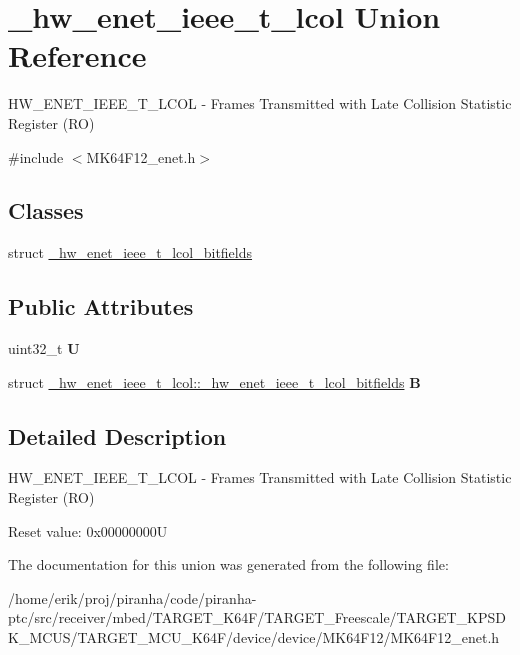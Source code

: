 \hypertarget{union__hw__enet__ieee__t__lcol}{}\section{\+\_\+hw\+\_\+enet\+\_\+ieee\+\_\+t\+\_\+lcol Union Reference}
\label{union__hw__enet__ieee__t__lcol}


H\+W\+\_\+\+E\+N\+E\+T\+\_\+\+I\+E\+E\+E\+\_\+\+T\+\_\+\+L\+C\+OL -\/ Frames Transmitted with Late Collision Statistic Register (RO)  




{\ttfamily \#include $<$M\+K64\+F12\+\_\+enet.\+h$>$}

\subsection*{Classes}
\begin{DoxyCompactItemize}
\item 
struct \hyperlink{struct__hw__enet__ieee__t__lcol_1_1__hw__enet__ieee__t__lcol__bitfields}{\+\_\+hw\+\_\+enet\+\_\+ieee\+\_\+t\+\_\+lcol\+\_\+bitfields}
\end{DoxyCompactItemize}
\subsection*{Public Attributes}
\begin{DoxyCompactItemize}
\item 
uint32\+\_\+t {\bfseries U}\hypertarget{union__hw__enet__ieee__t__lcol_afd630dcd0656f3be9912b740dc7c33c4}{}\label{union__hw__enet__ieee__t__lcol_afd630dcd0656f3be9912b740dc7c33c4}

\item 
struct \hyperlink{struct__hw__enet__ieee__t__lcol_1_1__hw__enet__ieee__t__lcol__bitfields}{\+\_\+hw\+\_\+enet\+\_\+ieee\+\_\+t\+\_\+lcol\+::\+\_\+hw\+\_\+enet\+\_\+ieee\+\_\+t\+\_\+lcol\+\_\+bitfields} {\bfseries B}\hypertarget{union__hw__enet__ieee__t__lcol_af63ca25ad71a2e86b401e66aa8a13baf}{}\label{union__hw__enet__ieee__t__lcol_af63ca25ad71a2e86b401e66aa8a13baf}

\end{DoxyCompactItemize}


\subsection{Detailed Description}
H\+W\+\_\+\+E\+N\+E\+T\+\_\+\+I\+E\+E\+E\+\_\+\+T\+\_\+\+L\+C\+OL -\/ Frames Transmitted with Late Collision Statistic Register (RO) 

Reset value\+: 0x00000000U 

The documentation for this union was generated from the following file\+:\begin{DoxyCompactItemize}
\item 
/home/erik/proj/piranha/code/piranha-\/ptc/src/receiver/mbed/\+T\+A\+R\+G\+E\+T\+\_\+\+K64\+F/\+T\+A\+R\+G\+E\+T\+\_\+\+Freescale/\+T\+A\+R\+G\+E\+T\+\_\+\+K\+P\+S\+D\+K\+\_\+\+M\+C\+U\+S/\+T\+A\+R\+G\+E\+T\+\_\+\+M\+C\+U\+\_\+\+K64\+F/device/device/\+M\+K64\+F12/M\+K64\+F12\+\_\+enet.\+h\end{DoxyCompactItemize}
